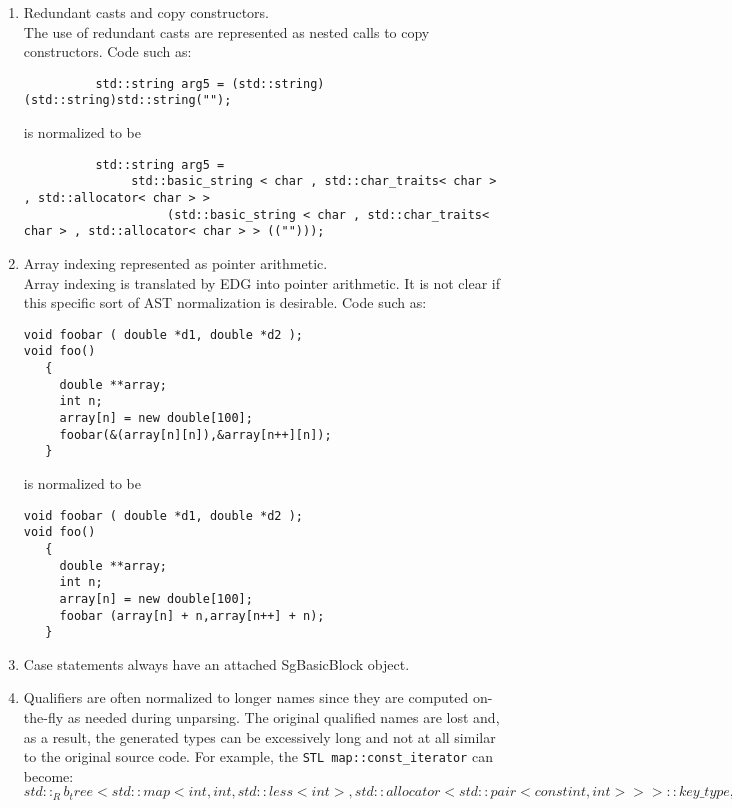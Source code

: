 \begin{enumerate}
     \item Redundant casts and copy constructors. \\
     The use of redundant casts are represented as nested calls to copy constructors.
     Code such as:
{\indent
{\mySmallFontSize
\begin{verbatim}
          std::string arg5 = (std::string) (std::string)std::string("");
\end{verbatim}
}}
     is normalized to be
{\indent
{\mySmallFontSize
\begin{verbatim}
          std::string arg5 = 
               std::basic_string < char , std::char_traits< char > , std::allocator< char > > 
                    (std::basic_string < char , std::char_traits< char > , std::allocator< char > > (("")));
\end{verbatim}
}}

     \item Array indexing represented as pointer arithmetic. \\
           Array indexing is translated by EDG into pointer arithmetic.  It
    is not clear if this specific sort of AST normalization is desirable.
     Code such as:
{\indent
{\mySmallFontSize
\begin{verbatim}
void foobar ( double *d1, double *d2 );
void foo()
   {
     double **array;
     int n;
     array[n] = new double[100];
     foobar(&(array[n][n]),&array[n++][n]);
   }
\end{verbatim}
}}
     is normalized to be
{\indent
{\mySmallFontSize
\begin{verbatim}
void foobar ( double *d1, double *d2 );
void foo()
   {
     double **array;
     int n;
     array[n] = new double[100];
     foobar (array[n] + n,array[n++] + n);
   }
\end{verbatim}
}}

\item Case statements always have an attached SgBasicBlock object.

\item Qualifiers are often normalized to longer names since they are computed on-the-fly
    as needed during unparsing.  The original qualified names are lost and, as a result, the 
    generated types can be excessively long and not at all similar to the original source
    code.   For example, the {\tt STL map::const\_iterator} can become:
    $ std::_Rb_tree < std::map < int , int , std::less< int > , std::allocator< std::pair<
    const int , int > > > ::key\_type , std::map < int , int , std::less< int > ,
    std::allocator< std::pair< const int , int > > > ::value_type , std::\_Select1st<
    std::map < int , int , std::less< int > , std::allocator< std::pair< const int , int >
    > > ::value\_type > , std::map < int , int , std::less< int > , std::allocator<
    std::pair< const int , int > > > ::key\_compare , std::allocator< std::pair< const int
    , int > > > ::const\_iterator $


\end{enumerate}
